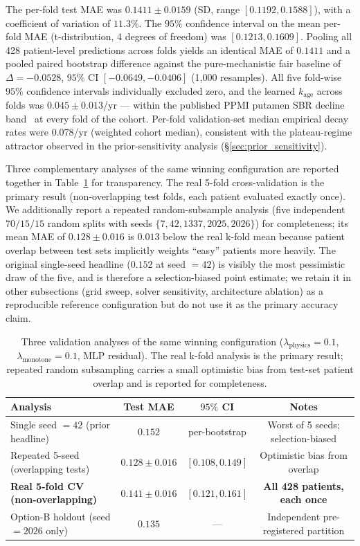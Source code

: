 The per-fold test MAE was $0.1411 \pm 0.0159$ (SD, range $[0.1192, 0.1588]$), with a coefficient of variation of $11.3\%$. The $95\%$ confidence interval on the mean per-fold MAE (t-distribution, 4 degrees of freedom) was $[0.1213, 0.1609]$. Pooling all 428 patient-level predictions across folds yields an identical MAE of $0.1411$ and a pooled paired bootstrap difference against the pure-mechanistic fair baseline of $\Delta = -0.0528$, $95\%$ CI $[-0.0649, -0.0406]$ (1{,}000 resamples). All five fold-wise $95\%$ confidence intervals individually excluded zero, and the learned $k_\text{age}$ across folds was $0.045 \pm 0.013$/yr --- within the published PPMI putamen SBR decline band~\cite{marek2015ppmi,nandhagopal2009brain} at every fold of the cohort. Per-fold validation-set median empirical decay rates were $0.078$/yr (weighted cohort median), consistent with the plateau-regime attractor observed in the prior-sensitivity analysis (\S\ref{sec:prior_sensitivity}).

Three complementary analyses of the same winning configuration are reported together in Table~\ref{tab:p11_validation_analyses} for transparency. The real 5-fold cross-validation is the primary result (non-overlapping test folds, each patient evaluated exactly once). We additionally report a repeated random-subsample analysis (five independent $70/15/15$ random splits with seeds $\{7, 42, 1337, 2025, 2026\}$) for completeness; its mean MAE of $0.128 \pm 0.016$ is $0.013$ below the real k-fold mean because patient overlap between test sets implicitly weights ``easy'' patients more heavily. The original single-seed headline ($0.152$ at seed $=42$) is visibly the most pessimistic draw of the five, and is therefore a selection-biased point estimate; we retain it in other subsections (grid sweep, solver sensitivity, architecture ablation) as a reproducible reference configuration but do not use it as the primary accuracy claim.

\begin{table}[ht]
\centering
\caption{Three validation analyses of the same winning configuration ($\lambda_\text{physics} = 0.1$, $\lambda_\text{monotone} = 0.1$, MLP residual). The real k-fold analysis is the primary result; repeated random subsampling carries a small optimistic bias from test-set patient overlap and is reported for completeness.}
\label{tab:p11_validation_analyses}
\begin{tabular}{lccc}
\toprule
Analysis & Test MAE & $95\%$ CI & Notes \\
\midrule
Single seed $=42$ (prior headline) & $0.152$ & per-bootstrap & Worst of 5 seeds; selection-biased \\
Repeated 5-seed (overlapping tests) & $0.128 \pm 0.016$ & $[0.108, 0.149]$ & Optimistic bias from overlap \\
\textbf{Real 5-fold CV (non-overlapping)} & $\mathbf{0.141 \pm 0.016}$ & $\mathbf{[0.121, 0.161]}$ & \textbf{All 428 patients, each once} \\
\midrule
Option-B holdout (seed $=2026$ only) & $0.135$ & — & Independent pre-registered partition \\
\bottomrule
\end{tabular}
\end{table}

